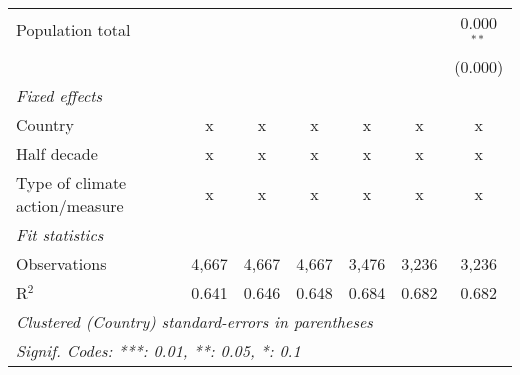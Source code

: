 \begin{tabular}{lcccccc}
   Population total                                                     &         &                &                &                &                & 0.000$^{**}$\\   
                                                                        &         &                &                &                &                & (0.000)\\   
   \emph{Fixed effects}\\
   Country                                                              & x       & x              & x              & x              & x              & x\\  
   Half decade                                                          & x       & x              & x              & x              & x              & x\\  
   Type of climate action/measure                                       & x       & x              & x              & x              & x              & x\\  
   \midrule \emph{Fit statistics}\\
   Observations                                                         & 4,667   & 4,667          & 4,667          & 3,476          & 3,236          & 3,236\\  
   R$^2$                                                                & 0.641   & 0.646          & 0.648          & 0.684          & 0.682          & 0.682\\  
   \midrule
   \multicolumn{7}{l}{\emph{Clustered (Country) standard-errors in parentheses}}\\
   \multicolumn{7}{l}{\emph{Signif. Codes: ***: 0.01, **: 0.05, *: 0.1}}\\
\end{tabular}
\par\endgroup


